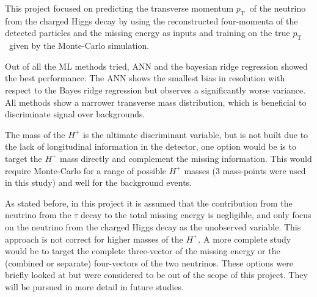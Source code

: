 \documentclass[twocolumn]{scrartcl}
\newcommand{\pt}{\ensuremath{p_\text{T}}~}
\newcommand{\mt}{\ensuremath{M_\text{T}}~}
\begin{document}
This project focused on predicting the transverse momentum \pt of the neutrino from the charged Higgs decay by using the reconstructed four-momenta of the detected particles and the missing energy as inputs and training on the true \pt given by the Monte-Carlo simulation.

Out of all the \gls{ML} methods tried, \gls{ANN} and the bayesian ridge regression showed the best performance. The  \gls{ANN} shows the smallest bias in resolution with respect to the Bayes ridge regression but observes a significantly worse variance. All methods show a narrower transverse mass distribution, which is beneficial to discriminate signal over backgrounds.

The mass of the $H^+$ is the ultimate discriminant variable, but is not built due to the lack of longitudinal information in the detector, one option would be is to target the $H^+$ mass directly and complement the missing information. This would require Monte-Carlo for a range of possible $H^+$ masses (3 mass-points were used in this study) and well for the background events. 

As stated before, in this project it is assumed that the contribution from the neutrino from the $\tau$ decay to the total missing energy is negligible, and only focus on the neutrino from the charged Higgs decay as the unobserved variable. This approach is not correct for higher masses of the $H^+$. A more complete study would be to target the complete three-vector of the missing energy or the (combined or separate) four-vectors of the two neutrinos. These options were briefly looked at but were considered to be out of the scope of this project. They will be pursued in more detail in future studies.


\end{document}
